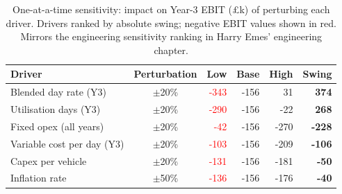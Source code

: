 \begin{table}[H]
\centering
\small
\caption{One-at-a-time sensitivity: impact on Year-3 EBIT 
(\pounds k) of perturbing each driver. Drivers ranked by absolute 
swing; negative EBIT values shown in red. Mirrors the engineering 
sensitivity ranking in Harry Emes' engineering chapter.}
\label{tab:sensitivity}
\begin{tabular}{lcrrrr}
\toprule
\textbf{Driver} & \textbf{Perturbation} & \textbf{Low} & \textbf{Base} & \textbf{High} & \textbf{Swing} \\
\midrule
Blended day rate (Y3) & $\pm$20\% & \textcolor{red}{-343} & -156 & 31 & \textbf{374} \\
Utilisation days (Y3) & $\pm$20\% & \textcolor{red}{-290} & -156 & -22 & \textbf{268} \\
Fixed opex (all years) & $\pm$20\% & \textcolor{red}{-42} & -156 & -270 & \textbf{-228} \\
Variable cost per day (Y3) & $\pm$20\% & \textcolor{red}{-103} & -156 & -209 & \textbf{-106} \\
Capex per vehicle & $\pm$20\% & \textcolor{red}{-131} & -156 & -181 & \textbf{-50} \\
Inflation rate & $\pm$50\% & \textcolor{red}{-136} & -156 & -176 & \textbf{-40} \\
\bottomrule
\end{tabular}
\end{table}
